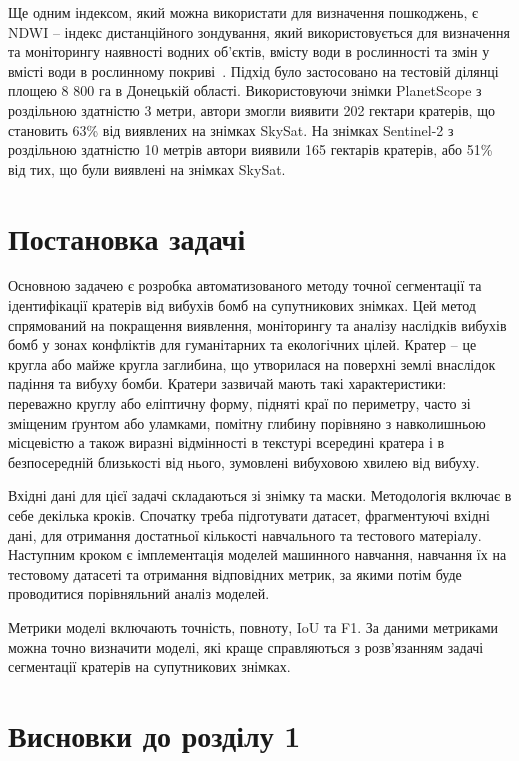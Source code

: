 Ще одним індексом, який можна використати для визначення пошкоджень,
є NDWI -- індекс дистанційного зондування, який використовується
для визначення та моніторингу наявності водних об'єктів,
вмісту води в рослинності та змін у вмісті води в рослинному покриві~\cite{kussul20232}.
Підхід було застосовано на тестовій ділянці площею 8 800
га в Донецькій області. Використовуючи знімки PlanetScope
з роздільною здатністю 3 метри, автори змогли виявити 202 гектари
кратерів, що становить 63\% від виявлених на знімках SkySat.
На знімках Sentinel-2 з роздільною здатністю 10 метрів автори
виявили 165 гектарів кратерів, або 51\% від тих, що були
виявлені на знімках SkySat.

\section{Постановка задачі}

Основною задачею є розробка автоматизованого методу точної
сегментації та ідентифікації кратерів від вибухів бомб на супутникових
знімках. Цей метод спрямований на покращення виявлення,
моніторингу та аналізу наслідків вибухів бомб у зонах
конфліктів для гуманітарних та екологічних цілей.
Кратер -- це кругла або майже кругла заглибина,
що утворилася на поверхні землі внаслідок падіння та
вибуху бомби. Кратери зазвичай мають такі характеристики:
переважно круглу або еліптичну форму, підняті краї по
периметру, часто зі зміщеним ґрунтом або уламками,
помітну глибину порівняно з навколишньою місцевістю
а також виразні відмінності в текстурі всередині кратера
і в безпосередній близькості від нього, зумовлені вибуховою хвилею від вибуху.

Вхідні дані для цієї задачі складаються зі знімку та маски. Методологія включає в себе
декілька кроків. Спочатку треба підготувати датасет, фрагментуючі вхідні дані, для
отримання достатньої кількості навчального та тестового матеріалу. Наступним кроком
є імплементація моделей машинного навчання, навчання їх на тестовому датасеті
та отримання відповідних метрик, за якими потім буде проводитися
порівняльний аналіз моделей.

Метрики моделі включають точність, повноту, IoU та F1. За даними метриками
можна точно визначити моделі, які краще справляються з розв'язанням
задачі сегментації кратерів на супутникових знімках.

\section*{Висновки до розділу 1}

